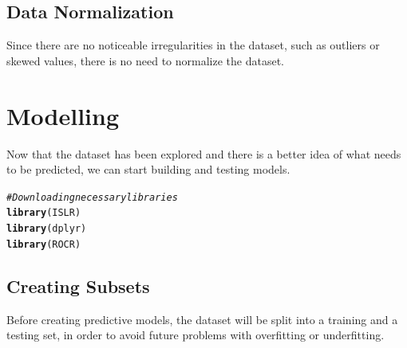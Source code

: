 \documentclass[a4paper,12pt]{article}\usepackage[]{graphicx}\usepackage[]{color}
\makeatletter
\newcommand{\hlcom}[1]{\textcolor[rgb]{0.678,0.584,0.686}{\textit{#1}}}%
\newcommand{\hlstd}[1]{\textcolor[rgb]{0.345,0.345,0.345}{#1}}%
\newcommand{\hlkwd}[1]{\textcolor[rgb]{0.737,0.353,0.396}{\textbf{#1}}}%
\newenvironment{kframe}{%
 \def\at@end@of@kframe{}%
 \ifinner\ifhmode%
  \def\at@end@of@kframe{\end{minipage}}%
  \begin{minipage}{\columnwidth}%
 \fi\fi%
 \def\FrameCommand##1{\hskip\@totalleftmargin \hskip-\fboxsep
 \colorbox{shadecolor}{##1}\hskip-\fboxsep
     \hskip-\linewidth \hskip-\@totalleftmargin \hskip\columnwidth}%
 \MakeFramed {\advance\hsize-\width
   \@totalleftmargin\z@ \linewidth\hsize
   \@setminipage}}%
 {\par\unskip\endMakeFramed%
 \at@end@of@kframe}
\newenvironment{knitrout}{}{} %
\makeatother
\begin{document}
\subsection{Data Normalization}\label{data_normalization}
Since there are no noticeable irregularities in the dataset, such as outliers or skewed values, there is no need to normalize the dataset.

\clearpage


\section{Modelling}\label{modelling}
Now that the dataset has been explored and there is a better idea of what needs to be predicted, we can start building and testing models.

\begin{knitrout}
\color{fgcolor}\begin{kframe}
\begin{alltt}
\hlcom{# Downloading necessary libraries}
\hlkwd{library}\hlstd{(ISLR)}
\hlkwd{library}\hlstd{(dplyr)}
\hlkwd{library}\hlstd{(ROCR)}
\end{alltt}
\end{kframe}
\end{knitrout}

\subsection{Creating Subsets}\label{subsets}
Before creating predictive models, the dataset will be split into a training and a testing set, in order to avoid future problems with overfitting or underfitting.
\end{document}
